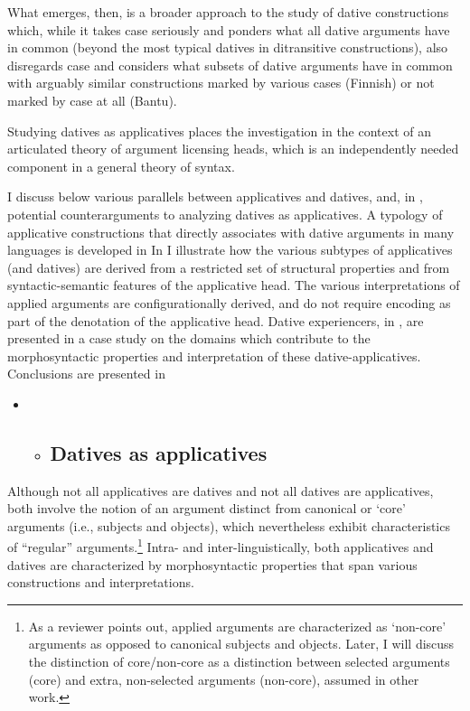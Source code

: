 \documentclass[output=paper,modfonts,nonflat]{langsci/langscibook}
\begin{document}
What emerges, then, is a broader approach to the study of dative constructions which, while it takes case seriously and ponders what all dative arguments have in common (beyond the most typical datives in ditransitive constructions), also disregards case and considers what subsets of dative arguments have in common with arguably similar constructions marked by various cases (Finnish) or not marked by case at all (Bantu). 

Studying datives as applicatives places the investigation in the context of an articulated theory of argument licensing heads, which is an independently needed component in a general theory of syntax.

I discuss below various parallels between applicatives and datives, and, in , potential counterarguments to analyzing datives as applicatives. A typology of applicative constructions that directly associates with dative arguments in many languages is developed in  In  I illustrate how the various subtypes of applicatives (and datives) are derived from a restricted set of structural properties and from syntactic-semantic features of the applicative head. The various interpretations of applied arguments are configurationally derived, and do not require encoding as part of the denotation of the applicative head. Dative experiencers, in , are presented in a case study on the domains which contribute to the morphosyntactic properties and interpretation of these dative-applicatives. Conclusions are presented in 

\begin{itemize}
\item \begin{itemize}
\item \subsection{Datives as applicatives}
\end{itemize}
\end{itemize}

Although not all applicatives are datives and not all datives are applicatives, both involve the notion of an argument distinct from canonical or ‘core’ arguments (i.e., subjects and objects), which nevertheless exhibit characteristics of “regular” arguments.\footnote{As a reviewer points out, applied arguments are characterized as ‘non-core’ arguments as opposed to canonical subjects and objects. Later, I will discuss the distinction of core/non-core as a distinction between selected arguments (core) and extra, non-selected arguments (non-core), assumed in other work.}  Intra- and inter-linguistically, both applicatives and datives are characterized by morphosyntactic properties that span various constructions and interpretations. 
\end{document}
